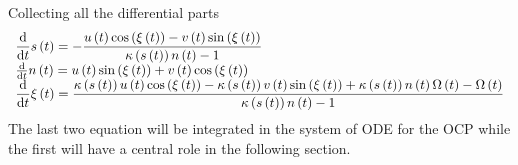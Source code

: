 %
Collecting all the differential parts
%
\begin{equation}
    \begin{array}{l} 
    \displaystyle
    {\frac {\rm d}{{\rm d}t}}s \left( t \right) =-{\frac {u \left( t \right) \cos \left( \xi \left( t \right) \right) -v \left( t \right) \sin \left( \xi \left( t \right) \right) }{\kappa \left( s \left( t \right)  \right) n \left( t\right) -1}}\\ 
    {\frac {\rm d}{{\rm d}t}}n \left( t\right) =u \left( t \right) \sin \left( \xi \left( t \right) \right) +v \left( t \right) \cos \left( \xi \left( t \right) \right) \\
    \displaystyle
    {\frac {\rm d}{{\rm d}t}}\xi \left( t \right) ={\frac {\kappa \left( s \left( t \right)  \right) u \left( t \right) \cos \left( \xi \left( t \right)  \right) -\kappa \left( s\left( t \right)  \right) v \left( t \right) \sin \left( \xi \left( t\right)  \right) +\kappa \left( s \left( t \right)  \right) n \left( t \right) \Omega \left( t \right) -\Omega \left( t \right) }{\kappa \left( s \left( t \right)  \right) n \left( t \right) -1}}
    \end{array} 
\end{equation}
%
The last two equation will be integrated in the system of ODE for the OCP while the first will have a central role in the following section.
%